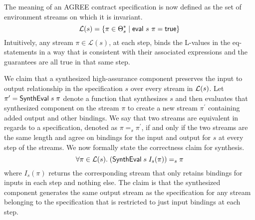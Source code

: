 The meaning of an AGREE contract specification is now defined as the
set of environment streams on which it is invariant.
%
\[
  {\mathcal L}({s}) = \{ {\pi \in \Theta_s^* \mid \mathsf{eval}\ s\ \pi = \mathsf{true}} \}
\]
%
\noindent Intuitively, any stream $\pi \in \mathcal{L}(s)$, at each step, binds
the L-values in the eq-statements in a way that is consistent with
their associated expressions and the guarantees are all true in that
same step.

We claim that a synthesized high-assurance component preserves the
input to output relationship in the specification $s$ over every
stream in ${\mathcal L}({s})$.  Let $\pi^\prime = \mathsf{SynthEval}\;
s\; \pi$ denote a function that synthesizes $s$ and then evaluates that
synthesized component on the stream $\pi$ to create a new stream
$\pi^\prime$ containing added output and other bindings. We say that
two streams are equivalent in regards to a specification, denoted as
$\pi =_s \pi^\prime$, if and only if the two streams are the same
length and agree on bindings for the input and output for $s$ at every
step of the streams.  We now formally state the correctness claim for
synthesis.
%
\[
  \forall \pi \in {\mathcal L}({s}).\; (\mathsf{SynthEval}\; s\; I_s(\pi)) =_s \pi\\
\]
%
where $I_s(\pi)$ returns the corresponding stream that only retains
bindings for inputs in each step and nothing else. The claim is that
the synthesized component generates the same output stream as the
specification for any stream belonging to the specification that is
restricted to just input bindings at each step.
